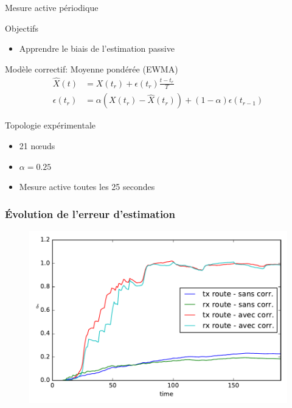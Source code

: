 \begin{frame}{Mesure active périodique}
  \begin{block}{Objectifs}
    \begin{itemize}
      \item Apprendre le biais de l'estimation passive
    \end{itemize}
  \end{block}
  \begin{alertblock}{Modèle correctif: Moyenne pondérée (EWMA)}
    \begin{align}
      \widehat{X}(t) &= X(t_r) + \epsilon(t_r)\frac{t - t_r}{T}\\
      \epsilon(t_r) &= \alpha (X(t_r) - \widehat{X}(t_r)) + (1 - \alpha)\epsilon(t_{r-1})
      \label{supervision:eqn:bias}
    \end{align}
  \end{alertblock}
  \begin{block}{Topologie expérimentale}
    \begin{itemize}
      \item 21 nœuds
      \item $\alpha = 0.25$
      \item Mesure active toutes les 25 secondes
    \end{itemize}
  \end{block}
\end{frame}

\begin{frame}\frametitle{Évolution de l'erreur d'estimation}
  \begin{figure}[ht]
    \centering
    \includegraphics[width=\textwidth]{figures/mesure_active.pdf}
  \end{figure}
\end{frame}


